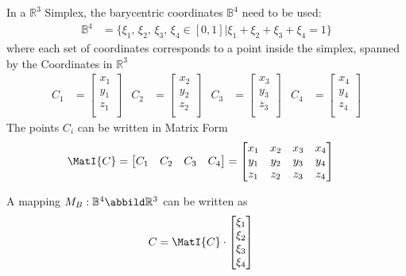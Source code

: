 \documentclass{mitschrift}
\newcommand{\R}{\mathbb{R}}
\newcommand{\Bary}{\mathbb{B}}
\begin{document}
In a $\R^3$ Simplex, the barycentric coordinates $\Bary^4$ need to be used: \begin{align}
    \Bary^4 &= \{ \xi_1,\,\xi_2,\,\xi_3,\,\xi_4 \in [0,1] | \xi_1 + \xi_2 + \xi_3 + \xi_4 = 1 \}
\end{align} where each set of coordinates corresponds to a point inside the simplex, spanned by the Coordinates in $\R^3$
\begin{align}
    C_1 &= \begin{bmatrix}
        x_1 \\
        y_1 \\
        z_1 \\
    \end{bmatrix} & C_2 &= \begin{bmatrix}
        x_2 \\
        y_2 \\
        z_2 \\
    \end{bmatrix} & C_3 &= \begin{bmatrix}
        x_3 \\
        y_3 \\
        z_3 \\
    \end{bmatrix} & C_4 &= \begin{bmatrix}
        x_4 \\
        y_4 \\
        z_4 \\
    \end{bmatrix}
\end{align}
The points $C_i$ can be written in Matrix Form \begin{align}
    \MatI{C} &= \begin{bmatrix}
        C_1 & C_2 & C_3 & C_4 \\
    \end{bmatrix} = \begin{bmatrix}
        x_1 & x_2 & x_3 & x_4 \\
        y_1 & y_2 & y_3 & y_4 \\
        z_1 & z_2 & z_3 & z_4 \\
    \end{bmatrix}
\end{align}

A mapping $M_B: \Bary^4 \abbild \R^3$ can be written as \begin{align}
    C &= \MatI{C} \cdot \begin{bmatrix}
        \xi_1 \\
        \xi_2 \\
        \xi_3 \\
        \xi_4 \\
    \end{bmatrix}
\end{align}
\end{document}
